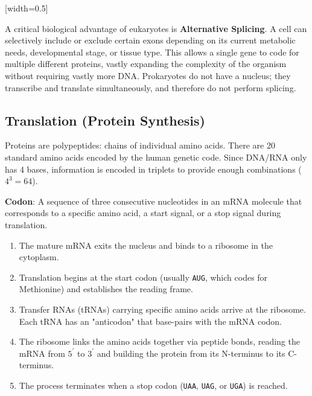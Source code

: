 [width=0.5\textwidth]

\sta A critical biological advantage of eukaryotes is \textbf{Alternative Splicing}. A cell can selectively include or exclude certain exons depending on its current metabolic needs, developmental stage, or tissue type. This allows a single gene to code for multiple different proteins, vastly expanding the complexity of the organism without requiring vastly more DNA. Prokaryotes do not have a nucleus; they transcribe and translate simultaneously, and therefore do not perform splicing.

\subsection{Translation (Protein Synthesis)}
Proteins are polypeptides: chains of individual amino acids. There are 20 standard amino acids encoded by the human genetic code. Since DNA/RNA only has 4 bases, information is encoded in triplets to provide enough combinations ($4^3 = 64$).

\begin{important}
  \textbf{Codon}: A sequence of three consecutive nucleotides in an mRNA molecule that corresponds to a specific amino acid, a start signal, or a stop signal during translation.
\end{important}

\begin{enumerate}
  \item The mature mRNA exits the nucleus and binds to a ribosome in the cytoplasm.
  \item Translation begins at the start codon (usually \texttt{AUG}, which codes for Methionine) and establishes the reading frame.
  \item Transfer RNAs (tRNAs) carrying specific amino acids arrive at the ribosome. Each tRNA has an "anticodon" that base-pairs with the mRNA codon.
  \item The ribosome links the amino acids together via peptide bonds, reading the mRNA from $5^{\prime}$ to $3^{\prime}$ and building the protein from its N-terminus to its C-terminus.
  \item The process terminates when a stop codon (\texttt{UAA}, \texttt{UAG}, or \texttt{UGA}) is reached.
\end{enumerate}



